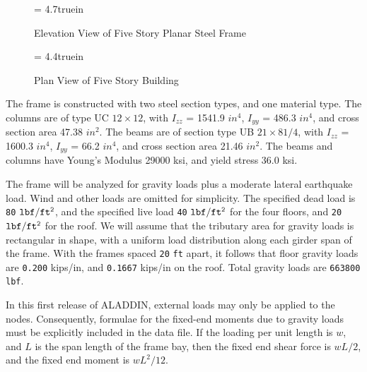 \clearpage

\begin{figure}[ht]
\vspace{0.10 in}
\epsfxsize= 4.7truein
\centerline{}
\caption{Elevation View of Five Story Planar Steel Frame}
\label{fig: five-story-building-elevation-view}
\end{figure}

\begin{figure}[ht]
\vspace{0.30 in}
\epsfxsize= 4.4truein
\centerline{}
\caption{Plan View of Five Story Building}
\label{fig: five-story-building-plan-view}
\end{figure}

\clearpage
\vspace{0.15 in}
\noindent\hspace{0.50 in}
The frame is constructed with two steel section types, and one material type. 
The columns are of type UC $12 \times 12$,
with $I_{zz}$ = 1541.9 $in^4$, $I_{yy}$ = 486.3 $in^4$,
and cross section area 47.38 $in^2$.
The beams are of section type UB $21 \times 8 1/4$,
with $I_{zz}$ = 1600.3 $in^4$, $I_{yy}$ = 66.2 $in^4$,
and cross section area 21.46 $in^2$.
The beams and columns have Young's Modulus 29000 ksi, and yield stress 36.0 ksi.

\vspace{0.15 in}
\noindent\hspace{0.5 in}
The frame will be analyzed for gravity loads
plus a moderate lateral earthquake load.
Wind and other loads are omitted for simplicity.
The specified dead load is {\tt 80} ${\tt lbf/ft^2}$,
and the specified live load {\tt 40} ${\tt lbf/ft^2}$ for the four floors,
and {\tt 20} ${\tt lbf/ft^2}$ for the roof.
We will assume that the tributary area for gravity loads
is rectangular in shape, with a uniform load distribution
along each girder span of the frame.
With the frames spaced {\tt 20} {\tt ft} apart,
it follows that floor gravity loads are {\tt 0.200} kips/in,
and {\tt 0.1667} kips/in on the roof.
Total gravity loads are {\tt 663800} {\tt lbf}.

\vspace{0.15 in}
\noindent\hspace{0.5 in}
In this first release of ALADDIN, external loads may only be applied to the nodes.
Consequently, formulae for the fixed-end moments due
to gravity loads must be explicitly included in the data file.
If the loading per unit length is $w$, and $L$ is the span length
of the frame bay, then the fixed end shear force is $wL/2$,
and the fixed end moment is $wL^2/12$.

